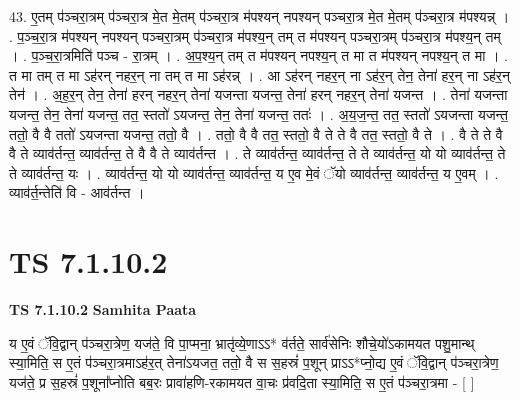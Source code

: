 \documentclass[17pt]{extarticle}
\begin{document}
43. ए॒तम् प॑ञ्चरा॒त्रम् प॑ञ्चरा॒त्र मे॒त मे॒तम् प॑ञ्चरा॒त्र म॑पश्यन् नपश्यन् पञ्चरा॒त्र मे॒त मे॒तम् प॑ञ्चरा॒त्र म॑पश्यन्न् । . प॒ञ्च॒रा॒त्र म॑पश्यन् नपश्यन् पञ्चरा॒त्रम् प॑ञ्चरा॒त्र म॑पश्य॒न् तम् त म॑पश्यन् पञ्चरा॒त्रम् प॑ञ्चरा॒त्र म॑पश्य॒न् तम् । . प॒ञ्च॒रा॒त्रमिति॑ पञ्च - रा॒त्रम् । . अ॒प॒श्य॒न् तम् त म॑पश्यन् नपश्य॒न् त मा त म॑पश्यन् नपश्य॒न् त मा । . त मा तम् त मा ऽह॑रन् नहर॒न् ना तम् त मा ऽह॑रन्न् । . आ ऽह॑रन् नहर॒न् ना ऽह॑र॒न् तेन॒ तेना॑ हर॒न् ना ऽह॑र॒न् तेन॑ । . अ॒ह॒र॒न् तेन॒ तेना॑ हरन् नहर॒न् तेना॑ यजन्ता यजन्त॒ तेना॑ हरन् नहर॒न् तेना॑ यजन्त । . तेना॑ यजन्ता यजन्त॒ तेन॒ तेना॑ यजन्त॒ तत॒ स्ततो॑ ऽयजन्त॒ तेन॒ तेना॑ यजन्त॒ ततः॑ । . अ॒य॒ज॒न्त॒ तत॒ स्ततो॑ ऽयजन्ता यजन्त॒ ततो॒ वै वै ततो॑ ऽयजन्ता यजन्त॒ ततो॒ वै । . ततो॒ वै वै तत॒ स्ततो॒ वै ते ते वै तत॒ स्ततो॒ वै ते । . वै ते ते वै वै ते व्याव॑र्तन्त॒ व्याव॑र्तन्त॒ ते वै वै ते व्याव॑र्तन्त । . ते व्याव॑र्तन्त॒ व्याव॑र्तन्त॒ ते ते व्याव॑र्तन्त॒ यो यो व्याव॑र्तन्त॒ ते ते व्याव॑र्तन्त॒ यः । . व्याव॑र्तन्त॒ यो यो व्याव॑र्तन्त॒ व्याव॑र्तन्त॒ य ए॒व मे॒वं ॅयो व्याव॑र्तन्त॒ व्याव॑र्तन्त॒ य ए॒वम् । . व्याव॑र्त॒न्तेति॑ वि - आव॑र्तन्त । \newline
\pagebreak
{}

\section{ TS 7.1.10.2 }

\textbf{TS 7.1.10.2 } \newline
\textbf{Samhita Paata} \newline

य ए॒वं ॅवि॒द्वान् प॑ञ्चरा॒त्रेण॒ यज॑ते॒ वि पा॒प्मना॒ भ्रातृ॑व्ये॒णाऽऽ* व॑र्तते॒ सार्व॑सेनिः शौचे॒यो॑ऽकामयत पशु॒मान्थ् स्या॒मिति॒ स ए॒तं प॑ञ्चरा॒त्रमाऽह॑र॒त् तेना॑ऽयजत॒ ततो॒ वै स स॒हस्रं॑ प॒शून् प्राऽऽ*प्नो॒द्य ए॒वं ॅवि॒द्वान् प॑ञ्चरा॒त्रेण॒ यज॑ते॒ प्र स॒हस्रं॑ प॒शूना᳚प्नोति बब॒रः प्रावा॑हणि-रकामयत वा॒चः प्र॑वदि॒ता स्या॒मिति॒ स ए॒तं प॑ञ्चरा॒त्रमा - [  ] \newline
\end{document}
